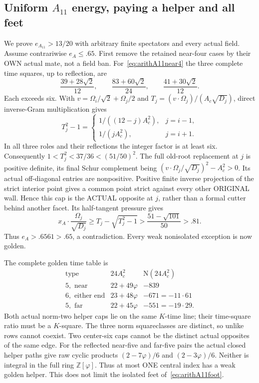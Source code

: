 \documentclass[11pt]{article}
\begin{document}
\subsection[Uniform A11 energy, paying a helper and all feet]{Uniform \(A_{11}\) energy, paying a helper and all feet}
\label{app:arithA11uniform}

We prove \(e_{A_{11}}>13/20\) with arbitrary
finite spectators and every actual field.
Assume contrariwise \(e_A\le.65\).
First remove the retained near-four cases
by their OWN actual mate, not a field ban.
For~\eqref{eq:arithA11near4} the three complete
time squares, up to reflection, are
\[
 {\frac{39+28\sqrt2}{12}},\qquad
 {\frac{83+60\sqrt2}{24}},\qquad
 {\frac{41+30\sqrt2}{12}}.
\tag{A11silver}\label{eq:arithA11silvertimes}
\]
Each exceeds six.
With \(v=\Omega_i/\sqrt2+\Omega_j/2\) and
\(T_j=(v\cdot\Omega_j)/(A_c\sqrt{D_j})\),
direct inverse-Gram multiplication gives
\[
 T_j^2-1=
 \begin{cases}
  1/((12-j)A_c^2),&j=i-1,\\
  1/(jA_c^2),&j=i+1 .
 \end{cases}
\]
In all three roles and their reflections the
integer factor is at least six.
Consequently \(1<T_j^2<37/36<(51/50)^2\).
The full old-root replacement at \(j\) is
positive definite, its final Schur complement
being \((v\cdot\Omega_j/\sqrt{D_j})^2-A_c^2>0\).
Its actual off-diagonal entries are nonpositive.
Positive finite inverse projection of the
strict interior point gives a common point
strict against every other ORIGINAL wall.
Hence this cap is the ACTUAL opposite at
\(j\), rather than a formal cutter behind
another facet.
Its half-tangent pressure gives
\[
 x_A\cdot{\frac{\Omega_j}{\sqrt{D_j}}}
 \ge T_j-\sqrt{T_j^2-1}
 >{\frac{51-\sqrt{101}}{50}}>.81 .
\]
Thus \(e_A>.6561>.65\), a contradiction.
Every weak nonisolated exception is now golden.

The complete golden time table is
\[
 \begin{array}{c|c|r}
 \text{type}&24A_c^2&\mathrm N(24A_c^2)\\ \hline
 5,\text{ near}&22+49\varphi&-839\\
 6,\text{ either end}&23+48\varphi&-671=-11\cdot61\\
 5,\text{ far}&22+45\varphi&-551=-19\cdot29 .
 \end{array}
\tag{A11gold}\label{eq:arithA11goldtimes}
\]
Both actual norm-two helper caps lie on the
same \(K\)-time line; their time-square ratio
must be a \(K\)-square.
The three norm squareclasses are distinct,
so unlike rows cannot coexist.
Two center-six caps cannot be the distinct
actual opposites of the same edge.
For the reflected near-five and far-five
pairs the actual closed helper paths give
raw cyclic products
\((2-7\varphi)/6\) and \((2-3\varphi)/6\).
Neither is integral in the full ring
\(\mathbb Z[\varphi]\).
Thus at most ONE central index has a weak
golden helper.  This does not limit the
isolated feet of~\eqref{eq:arithA11foot}.
\end{document}
